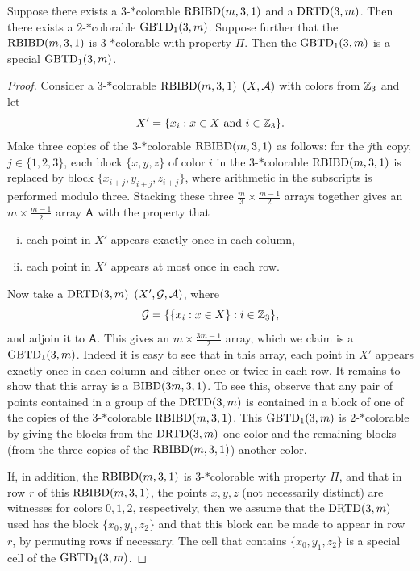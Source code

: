 \documentclass[draft, 11pt]{article}
\begin{document}
 \begin{proposition}
 \label{prop:tripling}
 Suppose there exists a $3$-$*$colorable $\textrm{RBIBD}(m,3,1)$ and a $\textrm{DRTD}(3,m)$.
 Then there exists a $2$-$*$colorable $\textrm{GBTD}_1(3,m)$. 
 Suppose further that the $\textrm{RBIBD}(m,3,1)$ is
 $3$-$*$colorable with property $\Pi$. Then the $\textrm{GBTD}_1(3,m)$ is a special
 $\textrm{GBTD}_1(3,m)$.
 \end{proposition}

\begin{proof}
Consider a $3$-$*$colorable $\textrm{RBIBD}(m,3,1)$ $(X,\mathcal A)$ with colors from $\mathbb Z_3$ and let
\begin{equation*}
X' = \{x_i : \text{$x\in X$ and $i\in\mathbb Z_3$}\}.
\end{equation*}
Make three copies of the $3$-$*$colorable $\textrm{RBIBD}(m,3,1)$ as follows: for the $j$th copy,
$j\in\{1,2,3\}$, each block $\{x,y,z\}$ of color $i$ in the
$3$-$*$colorable $\textrm{RBIBD}(m,3,1)$ is
replaced by block $\{x_{i+j},y_{i+j},z_{i+j}\}$, where arithmetic in the subscripts is
performed modulo three. Stacking these three $\frac{m}{3}\times\frac{m-1}{2}$
arrays together gives an $m\times \frac{m-1}{2}$ array ${\sf A}$ with the property that
\begin{enumerate}[(i)]
\item each point in $X'$ appears exactly once in each column,
\item each point in $X'$ appears at most once in each row.
\end{enumerate}
Now take a $\textrm{DRTD}(3,m)$ $(X',\mathcal G,\mathcal A)$, where
\begin{equation*}
\mathcal G = \{ \{x_i: x\in X\} : i\in \mathbb Z_3\},
\end{equation*}
and adjoin it to ${\sf A}$. This gives an $m\times \frac{3m-1}{2}$ array, which we claim
is a $\textrm{GBTD}_1(3,m)$. Indeed it is easy to see that in this array, each point in $X'$ appears
exactly once in each column and either once or twice in each row. It remains to show that this
array is a $\textrm{BIBD}(3m,3,1)$. To see this, observe that any pair of points contained in a group
of the $\textrm{DRTD}(3,m)$ is contained in a block of one of the copies of the
$3$-$*$colorable $\textrm{RBIBD}(m,3,1)$. This $\textrm{GBTD}_1(3,m)$ is
$2$-$*$colorable by giving the blocks from the $\textrm{DRTD}(3,m)$ one color and the remaining
blocks (from the three copies of the $\textrm{RBIBD}(m,3,1)$) another color.

If, in addition, the $\textrm{RBIBD}(m,3,1)$ is $3$-$*$colorable with property $\Pi$, and that
in row $r$ of this $\textrm{RBIBD}(m,3,1)$, the points $x,y,z$ (not necessarily distinct) are witnesses
for colors $0,1,2$, respectively, then we assume that the $\textrm{DRTD}(3,m)$ used has
the block $\{x_0,y_1,z_2\}$ and that this block can be made to appear in row $r$, by
permuting rows if necessary. The cell that contains $\{x_0,y_1,z_2\}$ is a special cell of the
$\textrm{GBTD}_1(3,m)$.
\end{proof}
 
\end{document}

